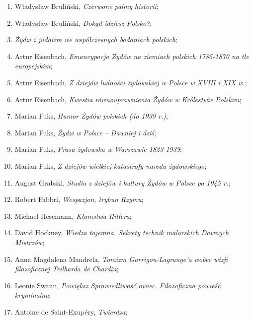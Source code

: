 \documentclass[a4paper,11pt]{article}
\begin{document}
\begin{enumerate}
\item Władysław Bruliński, \emph{Czerwone palmy historii};

\item Władysław Bruliński, \emph{Dokąd idziesz Polsko?};

\item \emph{Żydzi i judaizm we współczesnych badaniach polskich};

\item Artur Eisenbach, \emph{Emancypacja Żydów na ziemiach polskich
    1785-1870 na tle europejskim};

\item Artur Eisenbach, \emph{Z dziejów ludności żydowskiej w Polsce w
    XVIII i XIX w.};

\item Artur Eisenbach, \emph{Kwestia równouprawnienia Żydów w
    Królestwie Polskim};

\item Marian Fuks, \emph{Humor Żydów polskich (do 1939 r.)};

\item Marian Fuks, \emph{Żydzi w Polsce – Dawniej i dziś};

\item Marian Fuks, \emph{Prasa żydowska w Warszawie 1823-1939};

\item Marian Fuks, \emph{Z dziejów wielkiej katastrofy narodu
    żydowskiego};

\item August Grabski, \emph{Studia z dziejów i kultury Żydów w Polsce
    po 1945 r.};

\item Robert Fabbri, \emph{Wespazjan, trybun Rzymu};

\item Michael Hesemann, \emph{Kłamstwa Hitlera};

\item David Hockney, \emph{Wiedza tajemna. Sekrety technik malarskich
    Dawnych Mistrzów};

\item Anna Magdalena Mandrela, \emph{Tomizm Garrigou-Lagrange’a wobec
    wizji filozoficznej Teilharda de Chardin};

\item Leonie Swann, \emph{Powiększ Sprawiedliwość owiec. Filozoficzna
    powieść kryminalna};

\item Antoine de Saint-Exupéry, \emph{Twierdza};


\end{enumerate}
\end{document}
